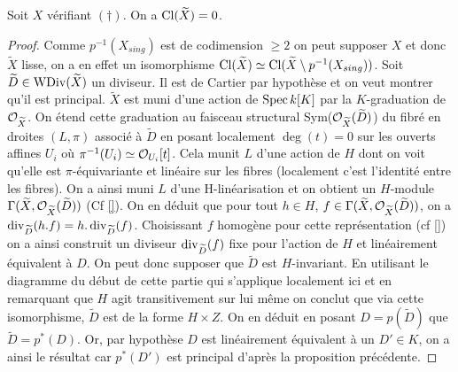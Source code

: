 \begin{thm}\label{clgtrivial}
Soit $X$ vérifiant $(\dagger)$. On a $\operatorname{Cl}(\widetilde{X})=0$.
\end{thm}
\begin{proof}
Comme $p^{-1}(X_{sing})$ est de codimension $\geq 2$ on peut supposer $X$ et donc $\widetilde{X}$ lisse, on a en effet un isomorphisme $\operatorname{Cl}(\widetilde{X})\simeq\operatorname{Cl}(\widetilde{X}\setminus p^{-1}(X_{sing}))$. Soit $\widetilde{D}\in \operatorname{WDiv}(\widetilde{X})$ un diviseur. Il est de Cartier par hypothèse et on veut montrer qu'il est principal. $\widetilde{X}$ est muni d'une action de $\operatorname{Spec} k[K]$ par la $K$-graduation de $\mathcal{O}_{\widetilde{X}}$. On étend cette graduation au faisceau structural Sym($\mathcal{O}_{\widetilde{X}}(\widetilde{D})$) du fibré en droites $(L,\pi)$ associé à $\widetilde{D}$ en posant localement $\deg(t)=0$ sur les ouverts affines $U_i$ où $\pi^{-1}(U_i)\simeq \mathcal{O}_{U_i}[t]$. Cela munit $L$ d'une action de $H$ dont on voit qu'elle est $\pi$-équivariante et linéaire sur les fibres (localement c'est l'identité entre les fibres). On a ainsi muni $L$ d'une H-linéarisation et on obtient un $H$-module $\Gamma(\widetilde{X}, \mathcal{O}_{\widetilde{X}}(\widetilde{D}))$ (Cf \ref{}). On en déduit que pour tout $h\in H$, $f\in \Gamma(\widetilde{X}, \mathcal{O}_{\widetilde{X}}(\widetilde{D}))$, on a $\operatorname{div}_{\widetilde{D}}(h.f)=h.\operatorname{div}_{\widetilde{D}}(f)$. Choisissant $f$ homogène pour cette représentation (cf \ref{}) on a ainsi construit un diviseur $\operatorname{div}_{\widetilde{D}}(f)$ fixe pour l'action de $H$ et linéairement équivalent à $D$. On peut donc supposer que $\widetilde{D}$ est $H$-invariant. En utilisant le diagramme du début de cette partie qui s'applique localement ici et en remarquant que $H$ agit transitivement sur lui même on conclut que via cette isomorphisme, $\widetilde{D}$ est de la forme $H\times Z$. On en déduit en posant $D=p(\widetilde{D})$ que $\widetilde{D}=p^*(D)$. Or, par hypothèse $D$ est linéairement équivalent à un $D'\in K$, on a ainsi le résultat car $p^*(D')$ est principal d'après la proposition précédente.
\end{proof}

